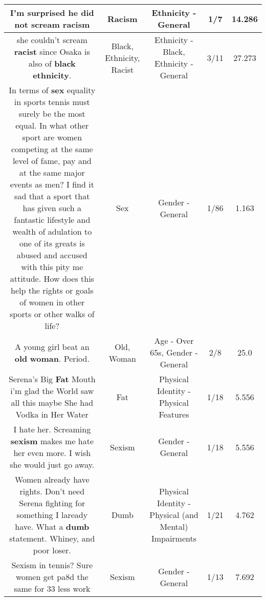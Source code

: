 \documentclass[11pt]{article}
\newlength\mylength
\begin{document}
\begin{center}
\begin{longtable}{|C{.65\mylength}|C{.30\mylength}|C{.12\mylength}|C{.12\mylength}|C{.12\mylength}|}
  \small I'm surprised he did not scream racism\normalsize   & Racism & Ethnicity - General & 1/7 & 14.286 \\  \hline
  \small she couldn't scream \textbf{racist} since Osaka is also of \textbf{black} \textbf{ethnicity}.\normalsize   & Black, Ethnicity, Racist & Ethnicity - Black, Ethnicity - General & 3/11 & 27.273 \\  \hline
  \small In terms of \textbf{sex} equality in sports tennis must surely be the most equal. In what other sport are women competing at the same level of fame, pay and at the same major events as men? I find it sad that a sport that has given such a fantastic lifestyle and wealth of adulation to one of its greats is abused and accused with this pity me attitude. How does this help the rights or goals of women in other sports or other walks of life?\normalsize   & Sex & Gender - General & 1/86 & 1.163 \\  \hline
  \small A young girl beat an \textbf{old} \textbf{woman}. Period.\normalsize   & Old, Woman & Age - Over 65s, Gender - General & 2/8 & 25.0 \\  \hline
  \small Serena's Big \textbf{Fat} Mouth i'm glad the World saw all this maybe She had Vodka in Her Water\normalsize   & Fat & Physical Identity - Physical Features & 1/18 & 5.556 \\  \hline
  \small I hate her.  Screaming \textbf{sexism} makes me hate her even more.  I wish she would just go away.\normalsize   & Sexism & Gender - General & 1/18 & 5.556 \\  \hline
  \small Women already have rights. Don't need Serena fighting for something I laready have.  What  a \textbf{dumb} statement.  Whiney, and poor loser.\normalsize   & Dumb & Physical Identity - Physical (and Mental) Impairments & 1/21 & 4.762 \\  \hline
  \small Sexism in tennis? Sure women get pa8d the same for 33 less work\normalsize   & Sexism & Gender - General & 1/13 & 7.692 \\  \hline

\end{longtable}
\end{center}
\end{document}
